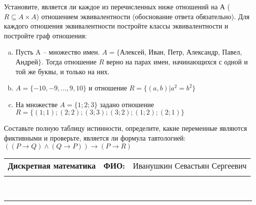 \documentclass[10pt]{exam}
\newcommand{\class}{Дискретная математика}
\newcommand{\examdate}{}
\begin{document}
\begin{questions}
\question
Установите, является ли каждое из перечисленных ниже отношений на А ($R \subseteq A \times A$) отношением эквивалентности (обоснование ответа обязательно). Для каждого отношения эквивалентности постройте классы 
эквивалентности и постройте граф отношения:
\begin{enumerate} [a)]\setcounter{enumi}{0}
\item Пусть A – множество имен. $A = \{ $Алексей, Иван, Петр, Александр, Павел, Андрей$ \}$. Тогда отношение $R$ верно на парах имен, начинающихся с одной и той же буквы, и только на них.
\item $A = \{-10, -9, … , 9, 10\}$ и отношение $ R = \{(a,b)|a^{2} = b^{2}\}$
\item На множестве $A = \{1; 2; 3\}$ задано отношение $R = \{(1; 1); (2; 2); (3; 3); (3; 2); (1; 2); (2; 1)\}$
\end{enumerate}\question Составьте полную таблицу истинности, определите, какие переменные являются фиктивными и проверьте, является ли формула тавтологией:
$(( P \rightarrow Q) \land (Q \rightarrow P)) \rightarrow (P \rightarrow R)$

\end{questions}
\newpage
\begin{flushright}
\begin{tabular}{p{2.8in} r l}
\textbf{\class} & \textbf{ФИО:} &Иванушкин Севастьян Сергеевич
\\

\textbf{\examdate} &&\\
\end{tabular}\\
\end{flushright}
\rule[1ex]{\textwidth}{.1pt}
\end{document}
